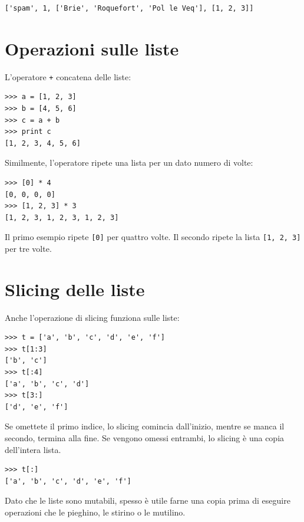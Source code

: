 \documentclass[10pt]{book}
\begin{document}
\begin{verbatim}
['spam', 1, ['Brie', 'Roquefort', 'Pol le Veq'], [1, 2, 3]]
\end{verbatim}



\section{Operazioni sulle liste}

L'operatore {\tt +} concatena delle liste:

\begin{verbatim}
>>> a = [1, 2, 3]
>>> b = [4, 5, 6]
>>> c = a + b
>>> print c
[1, 2, 3, 4, 5, 6]
\end{verbatim}
%
Similmente, l'operatore {\tt *} ripete una lista per un dato numero di volte:

\begin{verbatim}
>>> [0] * 4
[0, 0, 0, 0]
>>> [1, 2, 3] * 3
[1, 2, 3, 1, 2, 3, 1, 2, 3]
\end{verbatim}
%
Il primo esempio ripete {\tt [0]} per quattro volte. Il secondo ripete la lista {\tt [1, 2, 3]} per tre volte.


\section{Slicing delle liste}

Anche l'operazione di slicing funziona sulle liste:

\begin{verbatim}
>>> t = ['a', 'b', 'c', 'd', 'e', 'f']
>>> t[1:3]
['b', 'c']
>>> t[:4]
['a', 'b', 'c', 'd']
>>> t[3:]
['d', 'e', 'f']
\end{verbatim}
%
Se omettete il primo indice, lo slicing comincia dall'inizio, mentre se manca il secondo, termina alla fine. Se vengono omessi entrambi, lo slicing è una copia dell'intera lista.

\begin{verbatim}
>>> t[:]
['a', 'b', 'c', 'd', 'e', 'f']
\end{verbatim}
%
Dato che le liste sono mutabili, spesso è utile farne una copia prima di eseguire operazioni che le pieghino, le stirino o le mutilino.
\end{document}
